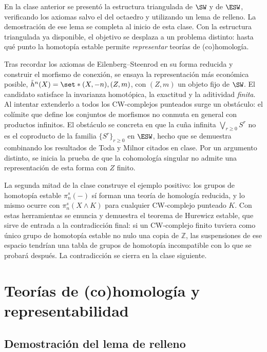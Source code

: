 En la clase anterior se presentó la estructura triangulada de $\SW$ y de $\ESW$, verificando los axiomas salvo el del octaedro y utilizando un lema de relleno. La demostración de ese lema se completa al inicio de esta clase. Con la estructura triangulada ya disponible, el objetivo se desplaza a un problema distinto: hasta qué punto la homotopía estable permite \emph{representar} teorías de (co)homología.

Tras recordar los axiomas de Eilenberg--Steenrod en su forma reducida y construir el morfismo de conexión, se ensaya la representación más económica posible, $\tilde h^n(X)=\set*{(X,-n),(Z,m)}$, con $(Z,m)$ un objeto fijo de $\SW$. El candidato satisface la invarianza homotópica, la exactitud y la aditividad \emph{finita}. Al intentar extenderlo a todos los CW-complejos punteados surge un obstáculo: el colímite que define los conjuntos de morfismos no conmuta en general con productos infinitos. El obstáculo se concreta en que la cuña infinita $\bigvee_{r\ge0}S^r$ no es el coproducto de la familia $\{S^r\}_{r\ge0}$ en $\ESW$, hecho que se demuestra combinando los resultados de Toda y Milnor citados en clase. Por un argumento distinto, se inicia la prueba de que la cohomología singular no admite una representación de esta forma con $Z$ finito.

La segunda mitad de la clase construye el ejemplo positivo: los grupos de homotopía estable $\pi_n^s(-)$ sí forman una teoría de homología reducida, y lo mismo ocurre con $\pi_n^s(X\wedge K)$ para cualquier CW-complejo punteado $K$. Con estas herramientas se enuncia y demuestra el teorema de Hurewicz estable, que sirve de entrada a la contradicción final: si un CW-complejo finito tuviera como único grupo de homotopía estable no nulo una copia de $\mathbb Z$, las suspensiones de ese espacio tendrían una tabla de grupos de homotopía incompatible con lo que se probará después. La contradicción se cierra en la clase siguiente.

\section{Teorías de (co)homología y representabilidad}

\subsection{Demostración del lema de relleno}

